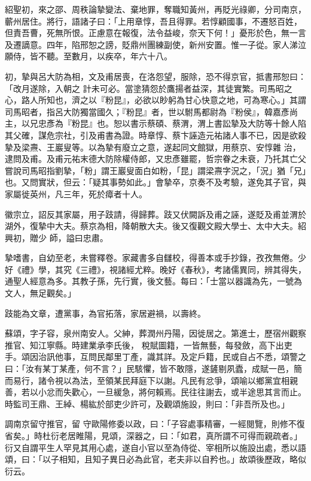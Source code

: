\begin{pinyinscope}
 紹聖初，來之邵、周秩論摯變法、棄地罪，奪職知黃州，再貶光祿卿，分司南京，蘄州居住。將行，語諸子曰：「上用章惇，吾且得罪。若惇顧國事，不遷怒百姓，但責吾曹，死無所恨。正慮意在報復，法令益峻，奈天下何！」憂形於色，無一言及遷謫意。四年，陷邢恕之謗，貶鼎州團練副使，新州安置。惟一子從。家人涕泣願侍，皆不聽。至數月，以疾卒，年六十八。



 初，摯與呂大防為相，文及甫居喪，在洛怨望，服除，恐不得京官，抵書邢恕曰：「改月遂除，入朝之
 計未可必。當塗猜怨於鷹揚者益深，其徒實繁。司馬昭之心，路人所知也，濟之以『粉昆』，必欲以眇躬為甘心快意之地，可為寒心。」其謂司馬昭者，指呂大防獨當國久；『粉昆』者，世以駙馬都尉為『粉侯』，韓嘉彥尚主，以兄忠彥為『粉昆』也。恕以書示蔡碩、蔡渭，渭上書訟摯及大防等十餘人陷其父確，謀危宗社，引及甫書為證。時章惇、蔡卞誣造元祐諸人事不已，因是欲殺摯及梁燾、王巖叟等。以為摯有廢立之意，遂起同文館獄，用蔡京、安惇雜
 治，逮問及甫。及甫元祐末德大防除權侍郎，又忠彥雖罷，哲宗眷之未衰，乃托其亡父嘗說司馬昭指劉摯，「粉」謂王巖叟面白如粉，「昆」謂梁燾字況之，「況」猶「兄」也。又問實狀，但云：「疑其事勢如此。」會摯卒，京奏不及考驗，遂免其子官，與家屬徙英州，凡三年，死於瘴者十人。



 徽宗立，詔反其家屬，用子跂請，得歸葬。跂又伏闕訴及甫之誣，遂貶及甫並渭於湖外，復摯中大夫。蔡京為相，降朝散大夫。後又復觀文殿大學士、太中大夫。紹興初，贈少
 師，謚曰忠肅。



 摯嗜書，自幼至老，未嘗釋卷。家藏書多自讎校，得善本或手抄錄，孜孜無倦。少好《禮》學，其究《三禮》，視諸經尤粹。晚好《春秋》，考諸儒異同，辨其得失，通聖人經意為多。其教子孫，先行實，後文藝。每曰：「士當以器識為先，一號為文人，無足觀矣。」



 跂能為文章，遭黨事，為官拓落，家居避禍，以壽終。



 蘇頌，字子容，泉州南安人。父紳，葬潤州丹陽，因徙居之。第進士，歷宿州觀察推官、知江寧縣。時建業承李氏後，
 稅賦圖籍，一皆無藝，每發斂，高下出吏手。頌因治訊他事，互問民鄰里丁產，識其詳。及定戶籍，民或自占不悉，頌警之曰：「汝有某丁某產，何不言？」民駭懼，皆不敢隱，遂鏟剔夙蠹，成賦一邑，簡而易行，諸令視以為法，至領某民拜庭下以謝。凡民有忿爭，頌喻以鄉黨宜相親善，若以小忿而失歡心，一旦緩急，將何賴焉。民往往謝去，或半途思其言而止。時監司王鼎、王綽、楊紘於部吏少許可，及觀頌施設，則曰：「非吾所及也。」



 調南京留守推官，留
 守歐陽修委以政，曰：「子容處事精審，一經閱覽，則修不復省矣。」時杜衍老居睢陽，見頌，深器之，曰：「如君，真所謂不可得而親疏者。」衍又自謂平生人罕見其用心處，遂自小官以至為侍從、宰相所以施設出處，悉以語頌，曰：「以子相知，且知子異日必為此官，老夫非以自矜也。」故頌後歷政，略似衍云。




\end{pinyinscope}
